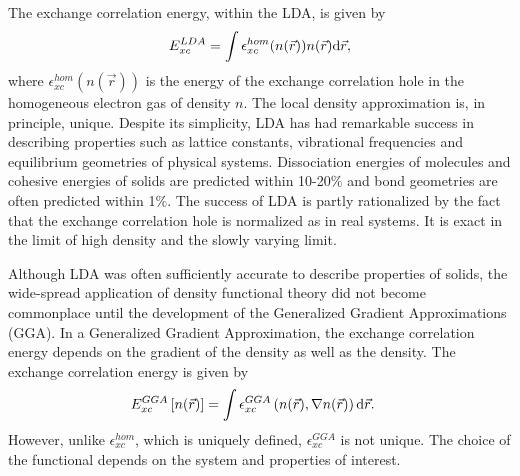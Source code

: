 \documentclass[book.tex]{subfiles}
\begin{document}
The exchange correlation energy, within the LDA, is given by
\begin{align}
E_{xc}^{LDA}=\int\epsilon_{xc}^{hom}(n(\vec{r}))n(\vec{r})\textup{d}\vec{r},
\end{align}
where $\epsilon_{xc}^{hom}(n(\vec{r}))$ is the energy of the exchange correlation hole in the homogeneous electron gas of density $n$.  The local density approximation is, in principle, unique.  %
Despite its simplicity,  LDA has had remarkable success in describing properties such as lattice constants, vibrational frequencies and equilibrium geometries of physical systems. Dissociation energies of molecules and cohesive energies of solids are predicted within 10-20$\%$  and bond geometries are often predicted within 1$\%$.  The success of LDA is partly rationalized by the fact that the exchange correlation hole is normalized as in real systems.  It is exact in the limit of high density and the slowly varying limit.

Although LDA was often sufficiently accurate to describe properties of solids, the wide-spread application of density functional theory did not become commonplace until the development of the Generalized Gradient Approximations (GGA).  In a Generalized Gradient Approximation, the exchange correlation energy depends on the gradient of the density as well as the density.  The exchange correlation energy is given by 
\begin{align}
E_{xc}^{GGA}\left[ n(\vec{r})\right] &= \int \epsilon_{xc}^{GGA}\left( n(\vec{r}),\nabla n(\vec{r}) \right) \textup{d}\vec{r}.
\end{align}
However, unlike $\epsilon_{xc}^{hom}$, which is uniquely defined, $\epsilon_{xc}^{GGA}$ is not unique.  %
The choice of the functional depends on the system and properties of interest.
\end{document}
